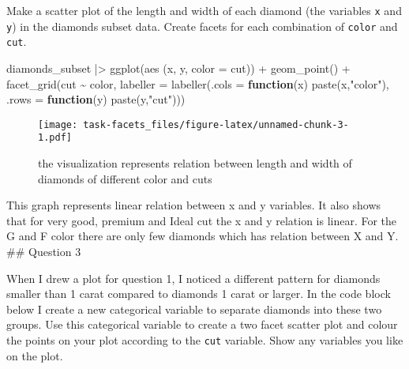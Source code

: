 \documentclass[
]{article}
\newenvironment{Shaded}{\begin{snugshade}}{\end{snugshade}}
\newcommand{\AttributeTok}[1]{\textcolor[rgb]{0.77,0.63,0.00}{#1}}
\newcommand{\ControlFlowTok}[1]{\textcolor[rgb]{0.13,0.29,0.53}{\textbf{#1}}}
\newcommand{\FunctionTok}[1]{\textcolor[rgb]{0.00,0.00,0.00}{#1}}
\newcommand{\NormalTok}[1]{#1}
\newcommand{\SpecialCharTok}[1]{\textcolor[rgb]{0.00,0.00,0.00}{#1}}
\newcommand{\StringTok}[1]{\textcolor[rgb]{0.31,0.60,0.02}{#1}}
\begin{document}
Make a scatter plot of the length and width of each diamond (the
variables \texttt{x} and \texttt{y}) in the diamonds subset data. Create
facets for each combination of \texttt{color} and \texttt{cut}.

\begin{Shaded}
\begin{Highlighting}[]
\NormalTok{diamonds\_subset }\SpecialCharTok{|\textgreater{}} \FunctionTok{ggplot}\NormalTok{(}\FunctionTok{aes}\NormalTok{ (x, y, }\AttributeTok{color =}\NormalTok{ cut)) }\SpecialCharTok{+} \FunctionTok{geom\_point}\NormalTok{() }\SpecialCharTok{+} \FunctionTok{facet\_grid}\NormalTok{(cut }\SpecialCharTok{\textasciitilde{}}\NormalTok{ color, }\AttributeTok{labeller =} \FunctionTok{labeller}\NormalTok{(}\AttributeTok{.cols =} \ControlFlowTok{function}\NormalTok{(x) }\FunctionTok{paste}\NormalTok{(x,}\StringTok{"color"}\NormalTok{), }\AttributeTok{.rows =} \ControlFlowTok{function}\NormalTok{(y) }\FunctionTok{paste}\NormalTok{(y,}\StringTok{"cut"}\NormalTok{)))}
\end{Highlighting}
\end{Shaded}

\begin{figure}
\centering
\texttt{[image: task-facets\_files/figure-latex/unnamed-chunk-3-1.pdf]}
\caption{the visualization represents relation between length and width
of diamonds of different color and cuts}
\end{figure}

This graph represents linear relation between x and y variables. It also
shows that for very good, premium and Ideal cut the x and y relation is
linear. For the G and F color there are only few diamonds which has
relation between X and Y. \#\# Question 3

When I drew a plot for question 1, I noticed a different pattern for
diamonds smaller than 1 carat compared to diamonds 1 carat or larger. In
the code block below I create a new categorical variable to separate
diamonds into these two groups. Use this categorical variable to create
a two facet scatter plot and colour the points on your plot according to
the \texttt{cut} variable. Show any variables you like on the plot.
\end{document}
